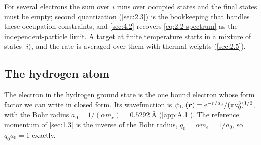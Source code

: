 For several electrons the sum over $i$ runs over occupied states and the final states must be empty; second quantization (\cref{sec:2.3}) is the bookkeeping that handles these occupation constraints, and \cref{sec:4.2} recovers \cref{eq:2.2-spectrum} as the independent-particle limit. A target at finite temperature starts in a mixture of states $|i\rangle$, and the rate is averaged over them with thermal weights (\cref{sec:2.5}).

\subsection{The hydrogen atom}

The electron in the hydrogen ground state is the one bound electron whose form factor we can write in closed form. Its wavefunction is $\psi_{1s}(\bm{r}) = \mathrm{e}^{-r/a_0}/(\pi a_0^3)^{1/2}$, with the Bohr radius $a_0 = 1/(\alpha m_e) = \SI{0.5292}{\angstrom}$ (\cref{app:A.1}). The reference momentum of \cref{sec:1.3} is the inverse of the Bohr radius, $q_0 = \alpha m_e = 1/a_0$, so $q_0a_0 = 1$ exactly.

